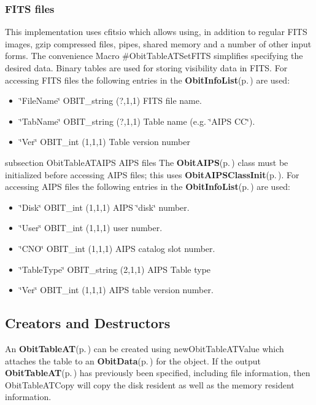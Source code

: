 \subsubsection{FITS files}\label{ObitTableWX_8h_TableFITS}
This implementation uses cfitsio which allows using, in addition to regular FITS images, gzip compressed files, pipes, shared memory and a number of other input forms. The convenience Macro \#Obit\-Table\-ATSet\-FITS simplifies specifying the desired data. Binary tables are used for storing visibility data in FITS. For accessing FITS files the following entries in the {\bf Obit\-Info\-List}{\rm (p.\,\pageref{structObitInfoList})} are used: \begin{itemize}
\item \char`\"{}File\-Name\char`\"{} OBIT\_\-string (?,1,1) FITS file name. \item \char`\"{}Tab\-Name\char`\"{} OBIT\_\-string (?,1,1) Table name (e.g. \char`\"{}AIPS CC\char`\"{}). \item \char`\"{}Ver\char`\"{} OBIT\_\-int (1,1,1) Table version number\end{itemize}
subsection Obit\-Table\-ATAIPS AIPS files The {\bf Obit\-AIPS}{\rm (p.\,\pageref{structObitAIPS})} class must be initialized before accessing AIPS files; this uses {\bf Obit\-AIPSClass\-Init}{\rm (p.\,\pageref{ObitAIPS_8c_a5})}. For accessing AIPS files the following entries in the {\bf Obit\-Info\-List}{\rm (p.\,\pageref{structObitInfoList})} are used: \begin{itemize}
\item \char`\"{}Disk\char`\"{} OBIT\_\-int (1,1,1) AIPS \char`\"{}disk\char`\"{} number. \item \char`\"{}User\char`\"{} OBIT\_\-int (1,1,1) user number. \item \char`\"{}CNO\char`\"{} OBIT\_\-int (1,1,1) AIPS catalog slot number. \item \char`\"{}Table\-Type\char`\"{} OBIT\_\-string (2,1,1) AIPS Table type \item \char`\"{}Ver\char`\"{} OBIT\_\-int (1,1,1) AIPS table version number.\end{itemize}
\subsection{Creators and Destructors}\label{ObitTableAT_8h_ObitTableATaccess}
An {\bf Obit\-Table\-AT}{\rm (p.\,\pageref{structObitTableAT})} can be created using new\-Obit\-Table\-ATValue which attaches the table to an {\bf Obit\-Data}{\rm (p.\,\pageref{structObitData})} for the object. If the output {\bf Obit\-Table\-AT}{\rm (p.\,\pageref{structObitTableAT})} has previously been specified, including file information, then Obit\-Table\-ATCopy will copy the disk resident as well as the memory resident information.

